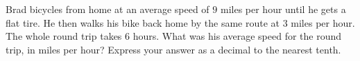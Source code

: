 Brad bicycles from home at an average speed of $9$ miles per hour until he gets a flat tire. He then walks his bike back home by the same route at $3$ miles per hour. The whole round trip takes $6$ hours. What was his average speed for the round trip, in miles per hour? Express your answer as a decimal to the nearest tenth.
